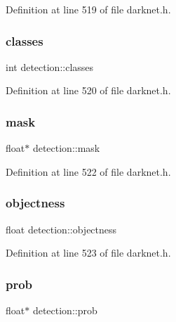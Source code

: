 Definition at line 519 of file darknet.\+h.

\mbox{\label{structdetection_a5501f226bdc7ce3630666a8065fa70b9}} 
\subsubsection{\texorpdfstring{classes}{classes}}
{\footnotesize\ttfamily int detection\+::classes}



Definition at line 520 of file darknet.\+h.

\mbox{\label{structdetection_a52d75f4c96f7ae42075f4792b1852946}} 
\subsubsection{\texorpdfstring{mask}{mask}}
{\footnotesize\ttfamily float$\ast$ detection\+::mask}



Definition at line 522 of file darknet.\+h.

\mbox{\label{structdetection_afd81464803f6cca28d0d3171158f0d52}} 
\subsubsection{\texorpdfstring{objectness}{objectness}}
{\footnotesize\ttfamily float detection\+::objectness}



Definition at line 523 of file darknet.\+h.

\mbox{\label{structdetection_a135fa8f73988691651cb54335e6e20c2}} 
\subsubsection{\texorpdfstring{prob}{prob}}
{\footnotesize\ttfamily float$\ast$ detection\+::prob}



